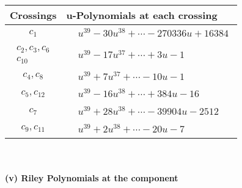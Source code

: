 \documentclass[1p]{elsarticle_modified}
\theoremstyle{definition}
\begin{document}
\begin{tabular}{m{50pt}|m{274pt}}
Crossings & \hspace{64pt}u-Polynomials at each crossing \\
\hline $$\begin{aligned}c_{1}\end{aligned}$$&$\begin{aligned}
&u^{39}-30 u^{38}+\cdots-270336 u+16384
\end{aligned}$\\
\hline $$\begin{aligned}c_{2},c_{3},c_{6}\\c_{10}\end{aligned}$$&$\begin{aligned}
&u^{39}-17 u^{37}+\cdots+3 u-1
\end{aligned}$\\
\hline $$\begin{aligned}c_{4},c_{8}\end{aligned}$$&$\begin{aligned}
&u^{39}+7 u^{37}+\cdots-10 u-1
\end{aligned}$\\
\hline $$\begin{aligned}c_{5},c_{12}\end{aligned}$$&$\begin{aligned}
&u^{39}-16 u^{38}+\cdots+384 u-16
\end{aligned}$\\
\hline $$\begin{aligned}c_{7}\end{aligned}$$&$\begin{aligned}
&u^{39}+28 u^{38}+\cdots-39904 u-2512
\end{aligned}$\\
\hline $$\begin{aligned}c_{9},c_{11}\end{aligned}$$&$\begin{aligned}
&u^{39}+2 u^{38}+\cdots-20 u-7
\end{aligned}$\\
\hline
\end{tabular}\\~\\
\newpage\renewcommand{\arraystretch}{1}
\flushleft \textbf{(v) Riley Polynomials at the component}\newline \\
\end{document}
